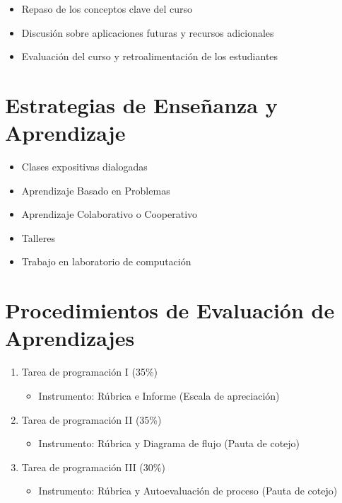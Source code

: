 \documentclass[11pt,letter,]{article}
\providecommand{\tightlist}{%
  \setlength{\itemsep}{0pt}\setlength{\parskip}{0pt}}
\begin{document}
\begin{itemize}
\tightlist
\item
  Repaso de los conceptos clave del curso
\item
  Discusión sobre aplicaciones futuras y recursos adicionales
\item
  Evaluación del curso y retroalimentación de los estudiantes
\end{itemize}

\hypertarget{estrategias-de-enseuxf1anza-y-aprendizaje}{%
\section{Estrategias de Enseñanza y
Aprendizaje}\label{estrategias-de-enseuxf1anza-y-aprendizaje}}

\begin{itemize}
\tightlist
\item
  Clases expositivas dialogadas
\item
  Aprendizaje Basado en Problemas
\item
  Aprendizaje Colaborativo o Cooperativo
\item
  Talleres
\item
  Trabajo en laboratorio de computación
\end{itemize}

\hypertarget{procedimientos-de-evaluaciuxf3n-de-aprendizajes}{%
\section{Procedimientos de Evaluación de
Aprendizajes}\label{procedimientos-de-evaluaciuxf3n-de-aprendizajes}}

\begin{enumerate}
\def\labelenumi{\arabic{enumi}.}
\tightlist
\item
  Tarea de programación I (35\%)

  \begin{itemize}
  \tightlist
  \item
    Instrumento: Rúbrica e Informe (Escala de apreciación)
  \end{itemize}
\item
  Tarea de programación II (35\%)

  \begin{itemize}
  \tightlist
  \item
    Instrumento: Rúbrica y Diagrama de flujo (Pauta de cotejo)
  \end{itemize}
\item
  Tarea de programación III (30\%)

  \begin{itemize}
  \tightlist
  \item
    Instrumento: Rúbrica y Autoevaluación de proceso (Pauta de cotejo)
  \end{itemize}
\end{enumerate}
\end{document}
